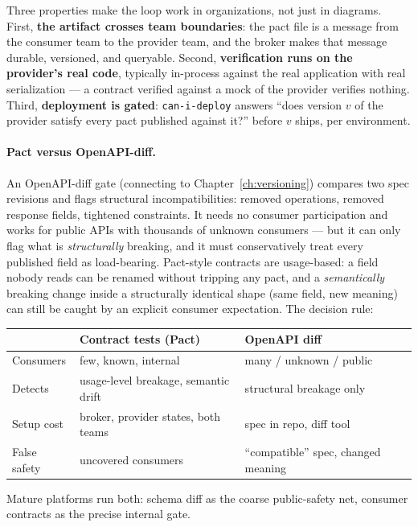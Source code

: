 Three properties make the loop work in organizations, not just in
diagrams. First, \textbf{the artifact crosses team boundaries}: the pact
file is a message from the consumer team to the provider team, and the
broker makes that message durable, versioned, and queryable. Second,
\textbf{verification runs on the provider's real code}, typically
in-process against the real application with real serialization --- a
contract verified against a mock of the provider verifies nothing. Third,
\textbf{deployment is gated}: \texttt{can-i-deploy} answers ``does version
$v$ of the provider satisfy every pact published against it?'' before $v$
ships, per environment.

\paragraph{Pact versus OpenAPI-diff.}
An OpenAPI-diff gate (connecting to Chapter~\ref{ch:versioning}) compares
two spec revisions and flags structural incompatibilities: removed
operations, removed response fields, tightened constraints. It needs no
consumer participation and works for public APIs with thousands of unknown
consumers --- but it can only flag what is \emph{structurally} breaking,
and it must conservatively treat every published field as load-bearing.
Pact-style contracts are usage-based: a field nobody reads can be renamed
without tripping any pact, and a \emph{semantically} breaking change inside
a structurally identical shape (same field, new meaning) can still be
caught by an explicit consumer expectation. The decision rule:

\begin{center}
\begin{tabularx}{\textwidth}{l X X}
\toprule
 & \textbf{Contract tests (Pact)} & \textbf{OpenAPI diff} \\
\midrule
Consumers & few, known, internal & many / unknown / public \\
Detects & usage-level breakage, semantic drift & structural breakage only \\
Setup cost & broker, provider states, both teams & spec in repo, diff tool \\
False safety & uncovered consumers & ``compatible'' spec, changed meaning \\
\bottomrule
\end{tabularx}
\end{center}

Mature platforms run both: schema diff as the coarse public-safety net,
consumer contracts as the precise internal gate.


